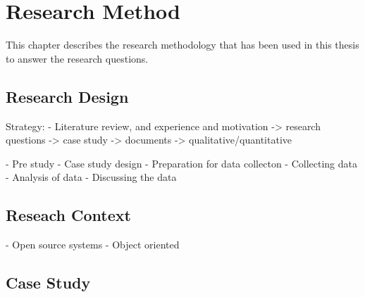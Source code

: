 
\chapter{Research Method}

This chapter describes the research methodology that has been used in this thesis to answer the research questions. 

\section{Research Design}

Strategy:
- Literature review, and experience and motivation -> research questions -> case study -> documents -> qualitative/quantitative

- Pre study
- Case study design
- Preparation for data collecton
- Collecting data
- Analysis of data
- Discussing the data

\section{Reseach Context}
- Open source systems
- Object oriented

\section{Case Study}


